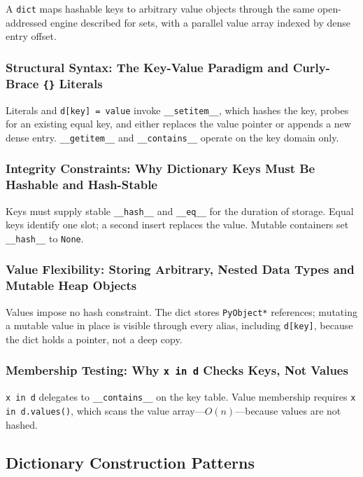 \documentclass[a4paper,twoside]{report}
\begin{document}
A \texttt{dict} maps hashable keys to arbitrary value objects through the same open-addressed engine described for sets, with a parallel value array indexed by dense entry offset.

\subsubsection{Structural Syntax: The Key-Value Paradigm and Curly-Brace \texttt{\{\}} Literals}

Literals and \texttt{d[key] = value} invoke \texttt{\_\_setitem\_\_}, which hashes the key, probes for an existing equal key, and either replaces the value pointer or appends a new dense entry. \texttt{\_\_getitem\_\_} and \texttt{\_\_contains\_\_} operate on the key domain only.

\subsubsection{Integrity Constraints: Why Dictionary Keys Must Be Hashable and Hash-Stable}

Keys must supply stable \texttt{\_\_hash\_\_} and \texttt{\_\_eq\_\_} for the duration of storage. Equal keys identify one slot; a second insert replaces the value. Mutable containers set \texttt{\_\_hash\_\_} to \texttt{None}.

\subsubsection{Value Flexibility: Storing Arbitrary, Nested Data Types and Mutable Heap Objects}

Values impose no hash constraint. The dict stores \texttt{PyObject*} references; mutating a mutable value in place is visible through every alias, including \texttt{d[key]}, because the dict holds a pointer, not a deep copy.

\subsubsection{Membership Testing: Why \texttt{x in d} Checks Keys, Not Values}

\texttt{x in d} delegates to \texttt{\_\_contains\_\_} on the key table. Value membership requires \texttt{x in d.values()}, which scans the value array---$O(n)$---because values are not hashed.


\subsection{Dictionary Construction Patterns}
\end{document}
